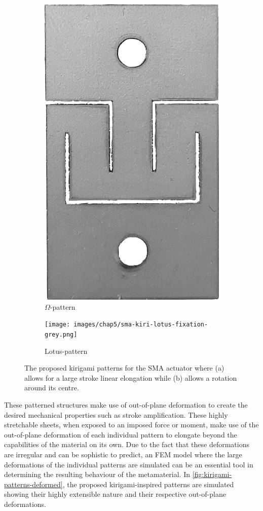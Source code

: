 \begin{figure}[hbt]
     \centering
     \begin{subfigure}[b]{0.45\textwidth}
         \centering
         \includegraphics[height=0.66\textwidth,angle=180]{images/chap5/sma-kiri-unit-grey.png}
         \caption{$\Omega$-pattern}
         \label{fig:omega-pattern-simple}
     \end{subfigure}
     \begin{subfigure}[b]{0.45\textwidth}
         \centering
         \texttt{[image: images/chap5/sma-kiri-lotus-fixation-grey.png]}
         \caption{Lotus-pattern}
         \label{fig:lotus-pattern-simple}
     \end{subfigure}
    \caption[The proposed kirigami patterns for the SMA actuator]{The proposed kirigami patterns for the SMA actuator where (a) allows for a large stroke linear elongation while (b) allows a rotation around its centre.}
    \label{fig:sma-kiri-patterns}
\end{figure}

These patterned structures make use of out-of-plane deformation to create the desired mechanical properties such as stroke amplification. These highly stretchable sheets, when exposed to an imposed force or moment, make use of the out-of-plane deformation of each individual pattern to elongate beyond the capabilities of the material on its own. Due to the fact that these deformations are irregular and can be sophistic to predict, an FEM model where the large deformations of the individual patterns are simulated can be an essential tool in determining the resulting behaviour of the metamaterial. In \cref{fig:kirigami-patterns-deformed}, the proposed kirigami-inspired patterns are simulated showing their highly extensible nature and their respective out-of-plane deformations.

